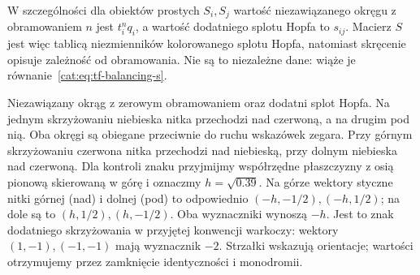 W szczególności dla obiektów prostych $S_i,S_j$ wartość niezawiązanego okręgu z obramowaniem $n$ jest $t_i^n q_i$, a wartość dodatniego splotu Hopfa to $s_{ij}$. Macierz $S$ jest więc tablicą niezmienników kolorowanego splotu Hopfa, natomiast skręcenie opisuje zależność od obramowania. Nie są to niezależne dane: wiąże je równanie~\eqref{cat:eq:tf-balancing-s}.

\begin{center}

{\small Niezawiązany okrąg z zerowym obramowaniem oraz dodatni splot Hopfa. Na jednym skrzyżowaniu niebieska nitka przechodzi nad czerwoną, a na drugim pod nią. Oba okręgi są obiegane przeciwnie do ruchu wskazówek zegara. Przy górnym skrzyżowaniu czerwona nitka przechodzi nad niebieską, przy dolnym niebieska nad czerwoną. Dla kontroli znaku przyjmijmy współrzędne płaszczyzny z osią pionową skierowaną w górę i oznaczmy $h=\sqrt{0.39}$. Na górze wektory styczne nitki górnej (nad) i dolnej (pod) to odpowiednio $(-h,-1/2),(-h,1/2)$; na dole są to $(h,1/2),(h,-1/2)$. Oba wyznaczniki wynoszą $-h$. Jest to znak dodatniego skrzyżowania w przyjętej konwencji warkoczy: wektory $(1,-1),(-1,-1)$ mają wyznacznik $-2$. Strzałki wskazują orientacje; wartości otrzymujemy przez zamknięcie identyczności i monodromii.}
\end{center}

